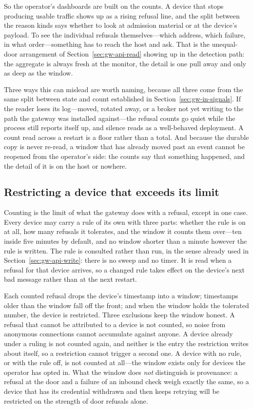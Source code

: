 \documentclass[12pt,a4paper]{report}
\begin{document}
So the operator's dashboards are built on the counts. A device that
stops producing usable traffic shows up as a rising refusal line, and
the split between the reason kinds says whether to look at admission
material or at the device's payload. To see the individual refusals
themselves---which address, which failure, in what order---something
has to reach the host and ask. That is the unequal-door arrangement of
Section~\ref{sec:gw-api-read} showing up in the detection path: the
aggregate is always fresh at the monitor, the detail is one pull away
and only as deep as the window.

Three ways this can mislead are worth naming, because all three come
from the same split between state and count established in
Section~\ref{sec:gw-in-signals}. If the reader loses its log---moved,
rotated away, or a broker not yet writing to the path the gateway was
installed against---the refusal counts go quiet while the process still
reports itself up, and silence reads as a well-behaved deployment. A
count read across a restart is a floor rather than a total. And because
the durable copy is never re-read, a window that has already moved past
an event cannot be reopened from the operator's side: the counts say
that something happened, and the detail of it is on the host or
nowhere.

\subsection{Restricting a device that exceeds its limit}
\label{sec:gw-detect-auto-prevent}

Counting is the limit of what the gateway does with a refusal, except
in one case. Every device may carry a rule of its own with three parts:
whether the rule is on at all, how many refusals it tolerates, and the
window it counts them over---ten inside five minutes by default, and no
window shorter than a minute however the rule is written. The rule is
consulted rather than run, in the sense already used in
Section~\ref{sec:gw-api-write}: there is no sweep and no timer. It is
read when a refusal for that device arrives, so a changed rule takes
effect on the device's next bad message rather than at the next
restart.

Each counted refusal drops the device's timestamp into a window;
timestamps older than the window fall off the front; and when the
window holds the tolerated number, the device is restricted. Three
exclusions keep the window honest. A refusal that cannot be attributed
to a device is not counted, so noise from anonymous connections cannot
accumulate against anyone. A device already under a ruling is not
counted again, and neither is the entry the restriction writes about
itself, so a restriction cannot trigger a second one. A device with no
rule, or with the rule off, is not counted at all---the window exists
only for devices the operator has opted in. What the window does
\emph{not} distinguish is provenance: a refusal at the door and a
failure of an inbound check weigh exactly the same, so a device that
has its credential withdrawn and then keeps retrying will be restricted
on the strength of door refusals alone.
\end{document}
